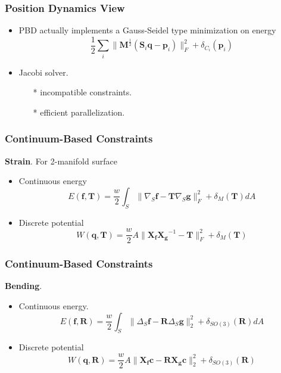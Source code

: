 \documentclass[serif,mathserif]{beamer}
\begin{document}
\begin{frame}
 \frametitle{Position Dynamics View}
 \begin{itemize}
  \item PBD actually implements a Gauss-Seidel type minimization on energy
    \begin{equation*}
     \frac{1}{2} \sum_i \|\mathbf{M}^{\frac{1}{2}}(\mathbf{S}_i\mathbf{q}-\mathbf{p}_i)\|^2_F+ \delta_{C_i}(\mathbf{p}_i)
    \end{equation*}
  \item Jacobi solver.
    \begin{itemize}
     \item[*] incompatible constraints.
     \item[*] efficient parallelization.
    \end{itemize}
 \end{itemize}
\end{frame}

\begin{frame}
 \frametitle{Continuum-Based Constraints}
 \textbf{Strain}. For 2-manifold surface
    \begin{itemize}
     \item Continuous energy
      \begin{equation*}
	E(\mathbf{f}, \mathbf{T})=\frac{w}{2}\int_S\|\nabla_S \mathbf{f}-\mathbf{T}\nabla_S \mathbf{g}\|^2_F
	+\delta_M(\mathbf{T})dA
      \end{equation*}
     \item Discrete potential
      \begin{equation*}
	W(\mathbf{q}, \mathbf{T})=\frac{w}{2}A\|\mathbf{X_fX_g}^{-1}-\mathbf{T}\|^2_F+\delta_M(\mathbf{T})
      \end{equation*}
    \end{itemize}
\end{frame}

\begin{frame}
 \frametitle{Continuum-Based Constraints}
 \textbf{Bending}.
  \begin{itemize}
   \item Continuous energy.
   \begin{equation*}
    E(\mathbf{f}, \mathbf{R})=\frac{w}{2}\int_S\|\Delta_S\mathbf{f}-\mathbf{R}\Delta_S\mathbf{g}\|^2_2
    +\delta_{SO(3)}(\mathbf{R})dA
   \end{equation*}
   \item Discrete potential
   \begin{equation*}
    W(\mathbf{q}, \mathbf{R})=\frac{w}{2}A\|\mathbf{X_fc}-\mathbf{RX_gc}\|^2_2+\delta_{SO(3)}(\mathbf{R})
   \end{equation*}
  \end{itemize}
\end{frame}
\end{document}
